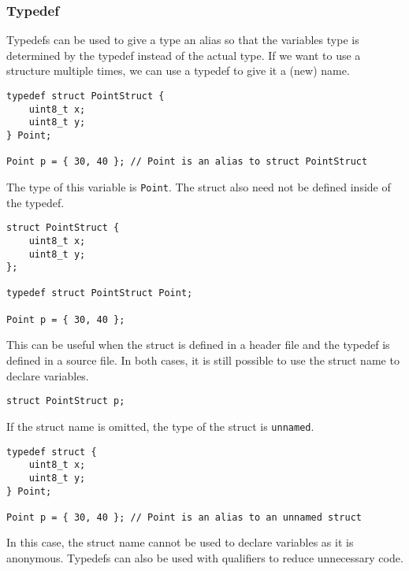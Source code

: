 \documentclass{article}
\begin{document}
\subsubsection{Typedef}
Typedefs can be used to give a type an alias so that the variables type
is determined by the typedef instead of the actual type. If we want to
use a structure multiple times, we can use a typedef to give it a (new)
name.
\begin{verbatim}
typedef struct PointStruct {
    uint8_t x;
    uint8_t y;
} Point;

Point p = { 30, 40 }; // Point is an alias to struct PointStruct
\end{verbatim}
The type of this variable is \texttt{Point}. The struct also
need not be defined inside of the typedef.
\begin{verbatim}
struct PointStruct {
    uint8_t x;
    uint8_t y;
};

typedef struct PointStruct Point;

Point p = { 30, 40 };
\end{verbatim}
This can be useful when the struct is defined in a header file and the
typedef is defined in a source file. In both cases, it is still possible
to use the struct name to declare variables.
\begin{verbatim}
struct PointStruct p;
\end{verbatim}
If the struct name is omitted, the type of the struct is
\texttt{unnamed}.
\begin{verbatim}
typedef struct {
    uint8_t x;
    uint8_t y;
} Point;

Point p = { 30, 40 }; // Point is an alias to an unnamed struct
\end{verbatim}
In this case, the struct name cannot be used to declare variables as it
is anonymous. Typedefs can also be used with qualifiers to reduce
unnecessary code.
\end{document}

